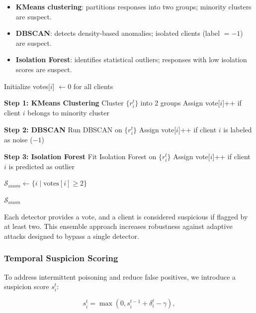 \begin{itemize}
    \item \textbf{KMeans clustering}: partitions responses into two groups; minority clusters are suspect.
    \item \textbf{DBSCAN}: detects density-based anomalies; isolated clients (label $=-1$) are suspect.
    \item \textbf{Isolation Forest}: identifies statistical outliers; responses with low isolation scores are suspect.
\end{itemize}

\begin{algorithm}[H]
\caption{Probe-based Anomaly Detection (Ensemble Voting)}

Initialize votes[$i$] $\gets 0$ for all clients\;

\textbf{Step 1: KMeans Clustering}\;
Cluster $\{r_i^t\}$ into 2 groups\;
Assign vote[$i$]++ if client $i$ belongs to minority cluster\;

\textbf{Step 2: DBSCAN}\;
Run DBSCAN on $\{r_i^t\}$\;
Assign vote[$i$]++ if client $i$ is labeled as noise ($-1$)\;

\textbf{Step 3: Isolation Forest}\;
Fit Isolation Forest on $\{r_i^t\}$\;
Assign vote[$i$]++ if client $i$ is predicted as outlier\;

$\mathcal{S}_{anom} \gets \{ i \mid \text{votes}[i] \geq 2 \}$\;

\Return $\mathcal{S}_{anom}$\;
\end{algorithm}
Each detector provides a vote, and a client is considered suspicious if flagged by at least two. 
This ensemble approach increases robustness against adaptive attacks designed to bypass a single detector.



\subsubsection{Temporal Suspicion Scoring}
To address intermittent poisoning and reduce false positives, we introduce a suspicion score $s_i^t$:

\begin{equation}
    s_i^t = \max(0, s_i^{t-1} + \delta_i^t - \gamma),
\end{equation}

